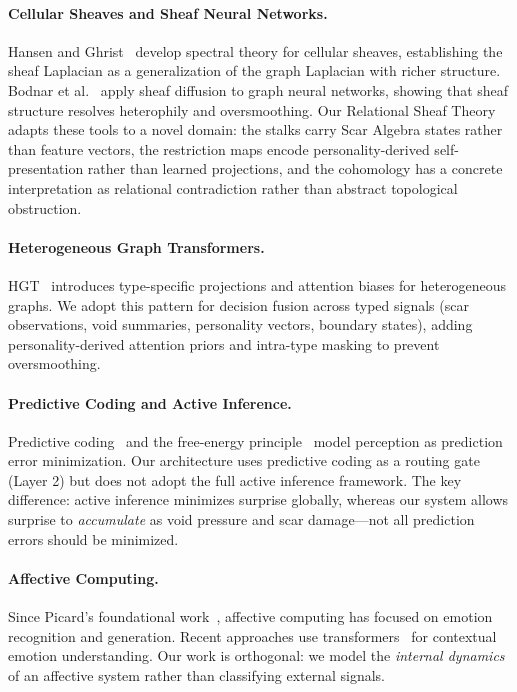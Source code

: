 \documentclass[11pt]{article}
\begin{document}
\paragraph{Cellular Sheaves and Sheaf Neural Networks.}
Hansen and Ghrist~\cite{hansen2019} develop spectral theory for cellular sheaves, establishing the sheaf Laplacian as a generalization of the graph Laplacian with richer structure. Bodnar et al.~\cite{bodnar2022} apply sheaf diffusion to graph neural networks, showing that sheaf structure resolves heterophily and oversmoothing. Our Relational Sheaf Theory adapts these tools to a novel domain: the stalks carry Scar Algebra states rather than feature vectors, the restriction maps encode personality-derived self-presentation rather than learned projections, and the cohomology has a concrete interpretation as relational contradiction rather than abstract topological obstruction.

\paragraph{Heterogeneous Graph Transformers.}
HGT~\cite{hu2020} introduces type-specific projections and attention biases for heterogeneous graphs. We adopt this pattern for decision fusion across typed signals (scar observations, void summaries, personality vectors, boundary states), adding personality-derived attention priors and intra-type masking to prevent oversmoothing.

\paragraph{Predictive Coding and Active Inference.}
Predictive coding~\cite{rao1999} and the free-energy principle~\cite{friston2010} model perception as prediction error minimization. Our architecture uses predictive coding as a routing gate (Layer 2) but does not adopt the full active inference framework. The key difference: active inference minimizes surprise globally, whereas our system allows surprise to \emph{accumulate} as void pressure and scar damage---not all prediction errors should be minimized.

\paragraph{Affective Computing.}
Since Picard's foundational work~\cite{picard1997}, affective computing has focused on emotion recognition and generation. Recent approaches use transformers~\cite{vaswani2017} for contextual emotion understanding. Our work is orthogonal: we model the \emph{internal dynamics} of an affective system rather than classifying external signals.
\end{document}
